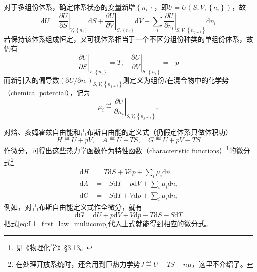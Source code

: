 \documentclass[main.tex]{subfiles}
\begin{document}
对于多组份体系，确定体系状态的变量新增$\left\{n_i\right\}$，即$U=U\left(S,V,\left\{n_i\right\}\right)$，故
\begin{equation}\label{eq:I.1_first_law_multicomp}
    \mathrm{d}U=\left.\frac{\partial U}{\partial S}\right|_{V,\left\{n_i\right\}}\mathrm{d}S+\left.\frac{\partial U}{\partial V}\right|_{S,\left\{n_i\right\}}\mathrm{d}V+\sum_i\left.\frac{\partial U}{\partial n_i}\right|_{S,V,\left\{n_{j\neq i}\right\}}\mathrm{d}n_i
\end{equation}
若保持该体系组成恒定，又可视体系相当于一个不区分组份种类的单组份体系，故仍有
\[\left.\frac{\partial U}{\partial S}\right|_{V,\left\{n_i\right\}}=T,\quad\left.\frac{\partial U}{\partial V}\right|_{S,\left\{n_i\right\}}=-p\]
而新引入的偏导数$\left(\partial U/\partial n_i\right)_{S,V,\left\{n_{j\neq i}\right\}}$则定义为组份$i$在混合物中的化学势（chemical potential），记为
\[\mu_i\eqdef\left.\frac{\partial U}{\partial n_i}\right|_{S,V,\left\{n_{j\neq i}\right\}},\]

对焓、亥姆霍兹自由能和吉布斯自由能的定义式（仍假定体系只做体积功）
\[H\eqdef U+pV,\quad A\eqdef U-TS,\quad G\eqdef U+pV-TS\]
作微分，可得出这些热力学函数作为特性函数（characteristic functions）\footnote{见《物理化学》\S 3.13。}的微分式\footnote{在处理开放系统时，还会用到巨热力学势$J\eqdef U-TS-n\mu$，这里不介绍了。}
\begin{align}
    \mathrm{d}H & = T\mathrm{d}S+V\mathrm{d}p+\sum_i\mu_i\mathrm{d}n_i\label{eq:I.1_dH} \\
    \mathrm{d}A & =-S\mathrm{d}T-p\mathrm{d}V+\sum_i\mu_i\mathrm{d}n_i\label{eq:I.1_dA} \\
    \mathrm{d}G & =-S\mathrm{d}T+V\mathrm{d}p+\sum_i\mu_i\mathrm{d}n_i\label{eq:I.1_dG}
\end{align}
例如，对吉布斯自由能定义式作全微分，就有
\[\mathrm{d}G=\mathrm{d}U+p\mathrm{d}V+V\mathrm{d}p-T\mathrm{d}S-S\mathrm{d}T\]
把式\eqref{eq:I.1_first_law_multicomp}代入上式就能得到相应的微分式。
\end{document}
